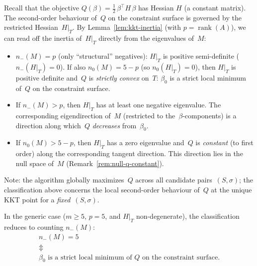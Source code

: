 \begin{remark}%
\label{rem:eigenvalue-signs}
Recall that the objective
$Q(\beta) = \tfrac{1}{2}\,\beta^\top H\,\beta$
has Hessian $H$ (a constant matrix).
The second-order behaviour of~$Q$ on the constraint
surface is governed by the restricted Hessian~$H|_T$.
By Lemma~\ref{lem:kkt-inertia}
(with $p = \operatorname{rank}(A)$),
we can read off the inertia of~$H|_T$ directly from
the eigenvalues of~$M$:
\begin{itemize}
\item $n_-(M) = p$ (only ``structural''
  negatives): $H|_T$ is positive
  semi-definite ($n_-(H|_T) = 0$).
  If also $n_0(M) = 5 - p$
  (so $n_0(H|_T) = 0$),
  then $H|_T$ is positive definite
  and~$Q$ is \emph{strictly convex} on~$T$:
  $\beta_0$ is a strict local minimum of~$Q$
  on the constraint surface.

\item If $n_-(M) > p$, then $H|_T$ has at least one
  negative eigenvalue.
  The corresponding eigendirection of~$M$
  (restricted to the~$\beta$-components) is a
  direction along which~$Q$ \emph{decreases}
  from~$\beta_0$.

\item If $n_0(M) > 5 - p$, then $H|_T$ has a zero
  eigenvalue and~$Q$ is \emph{constant} (to first
  order) along the corresponding tangent direction.
  This direction lies in the null space of~$M$
  (Remark~\ref{rem:null-q-constant}).
\end{itemize}
Note: the algorithm globally maximizes~$Q$ across all
candidate pairs~$(S, \sigma)$; the classification above
concerns the local second-order behaviour of~$Q$
at the unique KKT point for a \emph{fixed}~$(S, \sigma)$.

In the generic case ($m \geq 5$, $p = 5$, and $H|_T$
non-degenerate), the classification reduces to
counting $n_-(M)$:
\begin{gather*}
  n_-(M) = 5 \\
  \Updownarrow \\
  \text{$\beta_0$ is a strict local minimum
  of~$Q$ on the constraint surface.}
\end{gather*}
\end{remark}


